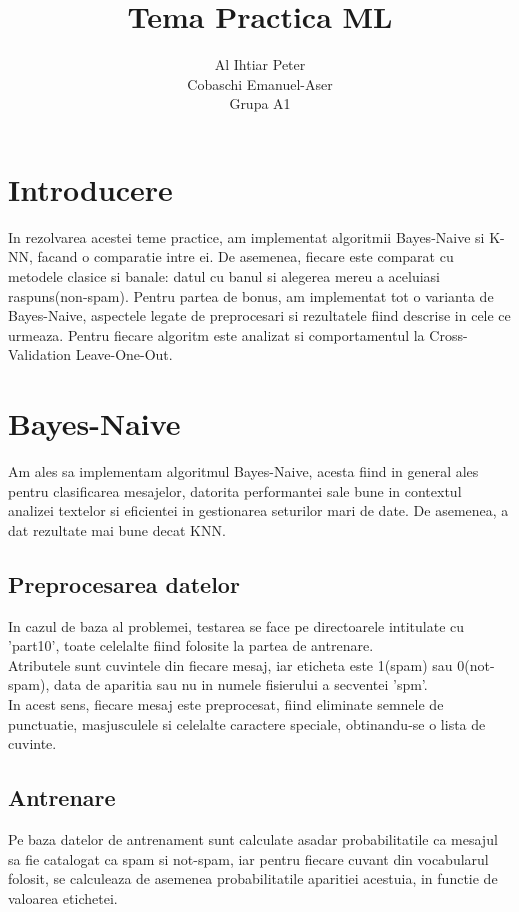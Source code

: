 \documentclass{article}
\title{Tema Practica ML}
\author{Al Ihtiar Peter \\ Cobaschi Emanuel-Aser\\  Grupa A1}
\begin{document}
\maketitle

\section{Introducere}
In rezolvarea acestei teme practice, am implementat algoritmii Bayes-Naive si K-NN, facand o comparatie intre ei. De asemenea, fiecare este comparat cu metodele clasice si banale: datul cu banul si alegerea mereu a aceluiasi raspuns(non-spam). Pentru partea de bonus, am implementat tot o varianta de Bayes-Naive, aspectele legate de preprocesari si rezultatele fiind descrise in cele ce urmeaza. Pentru fiecare algoritm este analizat si comportamentul la Cross-Validation Leave-One-Out.

\section{Bayes-Naive}
Am ales sa implementam algoritmul Bayes-Naive, acesta fiind in general ales pentru clasificarea mesajelor, datorita performantei sale bune in contextul analizei textelor si eficientei in gestionarea seturilor mari de date. De asemenea, a dat rezultate mai bune decat KNN.
\subsection{Preprocesarea datelor}
In cazul de baza al problemei, testarea se face pe directoarele intitulate cu 'part10', toate celelalte fiind folosite la partea de antrenare. \\
Atributele sunt cuvintele din fiecare mesaj, iar eticheta este 1(spam) sau 0(not-spam), data de aparitia sau nu in numele fisierului a secventei 'spm'.\\ In acest sens, fiecare mesaj este preprocesat, fiind eliminate semnele de punctuatie, masjusculele si celelalte caractere speciale, obtinandu-se o lista de cuvinte.
\subsection{Antrenare}
Pe baza datelor de antrenament sunt calculate asadar probabilitatile ca mesajul sa fie catalogat ca spam si not-spam, iar pentru fiecare cuvant din vocabularul folosit, se calculeaza de asemenea probabilitatile aparitiei acestuia, in functie de valoarea etichetei.\\
\end{document}
